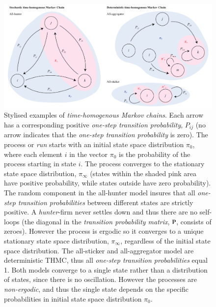 \documentclass[preprint, 12pt]{elsarticle}
\begin{document}
\begin{figure}[ht!]
	\centering
	\includegraphics[width=\textwidth]{Graphics/Markov3.pdf}
	\caption{Stylised examples of \emph{time-homogenous Markov chains}. Each arrow has a corresponding positive \emph{one-step transition probability}, $P_{ij}$ (no arrow indicates that the \emph{one-step transition probability} is zero). The process or \emph{run} starts with an initial state space distribution $\pi_0$, where each element $i$ in the vector $\pi_0$ is the probability of the process starting in state $i$. The process converges to the stationary state space distribution, $\pi_\infty$ (states within the shaded pink area have positive probability, while states outside have zero probability). The random component in the all-hunter model insures that all \emph{one-step transition probabilities} between different states are strictly positive. A \emph{hunter}-firm never settles down and thus there are no self-loops (the diagonal in the \emph{transition probability matrix}, $\rm P$, consists of zeroes). However the process is ergodic so it converges to a unique stationary state space distribution, $\pi_\infty$, regardless of the initial state space distribution. The all-sticker and all-aggregator model are deterministic THMC, thus all \emph{one-step transition probabilities} equal 1. Both models converge to a single state rather than a distribution of states, since there is no oscillation. However the processes are \emph{non-ergodic}, and thus the single state depends on the specific probabilities in initial state space distribution $\pi_0$.}
	\label{fig:markov}
\end{figure}
\end{document}

